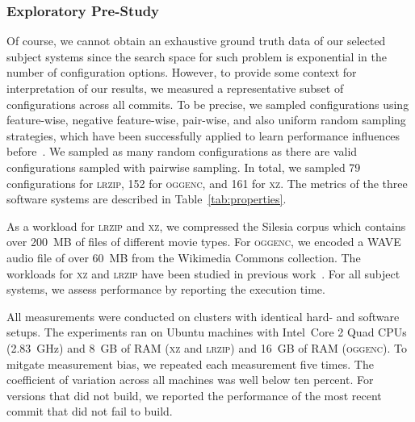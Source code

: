 \documentclass[sigconf]{acmart}
\begin{document}
	\subsubsection{Exploratory Pre-Study}
	Of course, we cannot obtain an exhaustive ground truth data of our selected subject systems since the search space for such problem is exponential in the number of configuration options. 
	However, to provide some context for interpretation of our results, we measured a representative subset of configurations across all commits. To be precise, we sampled configurations using feature-wise, negative feature-wise, pair-wise, and also uniform random sampling strategies, which have been successfully applied to learn performance influences before~\cite{alves_sampling_2020}. We sampled as many random configurations as there are valid configurations sampled with pairwise sampling. In total, we sampled 79 configurations for \textsc{lrzip}, 152 for \textsc{oggenc}, and 161 for \textsc{xz}. The metrics of the three software systems are described in Table~\ref{tab:properties}.
	
	
	As a workload for \textsc{lrzip} and \textsc{xz}, we compressed the Silesia corpus which contains over 200~MB of files of different movie types. For \textsc{oggenc}, we encoded a WAVE audio file of over 60~MB from the Wikimedia Commons collection. The workloads for \textsc{xz} and \textsc{lrzip} have been studied in previous work~\cite{siegmund_views_2015,muhlbauer_accurate_2019}. For all subject systems, we assess performance by reporting the execution time.
	
	All measurements were conducted on clusters with identical hard- and software setups. The experiments ran on Ubuntu machines with Intel~Core
	2 Quad CPUs (2.83~GHz) and 8~GB of RAM (\textsc{xz} and \textsc{lrzip}) and 16~GB of RAM (\textsc{oggenc}). To mitgate measurement bias, we repeated each measurement five times. The coefficient of variation across all machines was well below ten percent. For versions that did not build, we reported the performance of the most recent commit that did not fail to build.
	
\end{document}
